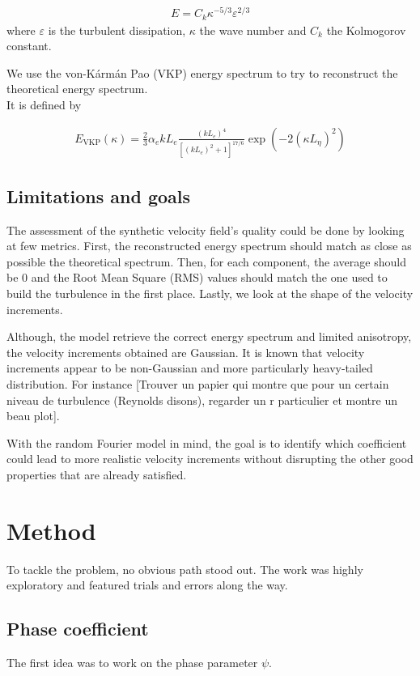 \documentclass[a4paper,12pt]{article}
\begin{document}
\begin{align}
    E = C_k \kappa^{-5/3}\varepsilon^{2/3}
\end{align}
where $\varepsilon$ is the turbulent dissipation, $\kappa$ the wave number and $C_k$ the Kolmogorov constant.

\bigskip
We use the von-Kármán Pao (VKP) energy spectrum to try to reconstruct the theoretical energy spectrum. \\
It is defined by 

\begin{align}
    E_{\text{VKP}}(\kappa)=\frac{2}{3}\alpha_e k L_e \frac{(kL_e)^4}{[(kL_e)^2+1]^{17/6}}\exp(-2(\kappa L_\eta)^2)
\end{align}

\subsection{Limitations and goals}
The assessment of the synthetic velocity field's quality could be done by looking at few metrics. First, the reconstructed energy spectrum should match as close as possible the theoretical spectrum. Then, for each component, the average should be 0 and the Root Mean Square (RMS) values should match the one used to build the turbulence in the first place. Lastly, we look at the shape of the velocity increments.   

\bigskip
Although, the model retrieve the correct energy spectrum and limited anisotropy, the velocity increments obtained are Gaussian. It is known that velocity increments appear to be non-Gaussian and more particularly heavy-tailed distribution. For instance \cite{} [Trouver un papier qui montre que pour un certain niveau de turbulence (Reynolds disons), regarder un r particulier et montre un beau plot].

\bigskip
With the random Fourier model in mind, the goal is to identify which coefficient could lead to more realistic velocity increments without disrupting the other good properties that are already satisfied. 


\section{Method}
To tackle the problem, no obvious path stood out. The work was highly exploratory and featured trials and errors along the way.

\subsection{Phase coefficient}
The first idea was to work on the phase parameter $\psi$. 
\end{document}

